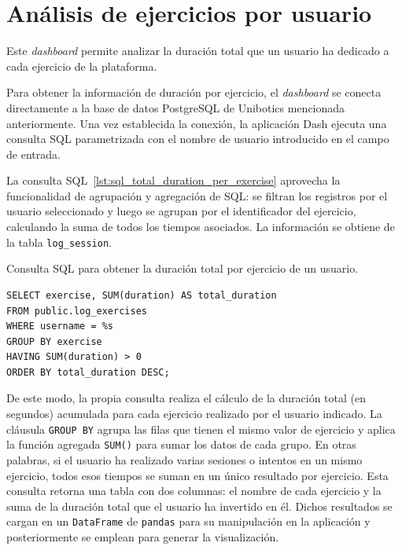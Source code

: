 \documentclass[a4paper, 12pt]{book}
\begin{document}
\section{Análisis de ejercicios por usuario}
\label{sec:dash1a}

Este \textit{dashboard} permite analizar la duración total que un usuario ha dedicado a cada ejercicio de la plataforma.

Para obtener la información de duración por ejercicio, el \textit{dashboard} se conecta directamente a la base de datos PostgreSQL de Unibotics mencionada anteriormente. Una vez establecida la conexión, la aplicación Dash ejecuta una consulta SQL parametrizada con el nombre de usuario introducido en el campo de entrada.

La consulta SQL~\ref{lst:sql_total_duration_per_exercise} aprovecha la funcionalidad de agrupación y agregación de SQL: se filtran los registros por el usuario seleccionado y luego se agrupan por el identificador del ejercicio, calculando la suma de todos los tiempos asociados. La información se obtiene de la tabla \texttt{log\_session}.

\begin{listing}[h!]
\caption{Consulta SQL para obtener la duración total por ejercicio de un usuario.}
\label{lst:sql_total_duration_per_exercise}
\begin{verbatim}
SELECT exercise, SUM(duration) AS total_duration
FROM public.log_exercises
WHERE username = %s
GROUP BY exercise
HAVING SUM(duration) > 0
ORDER BY total_duration DESC;
\end{verbatim}
\end{listing}

De este modo, la propia consulta realiza el cálculo de la duración total (en segundos) acumulada para cada ejercicio realizado por el usuario indicado. La cláusula \texttt{GROUP BY} agrupa las filas que tienen el mismo valor de ejercicio y aplica la función agregada \texttt{SUM()} para sumar los datos de cada grupo. En otras palabras, si el usuario ha realizado varias sesiones o intentos en un mismo ejercicio, todos esos tiempos se suman en un único resultado por ejercicio. Esta consulta retorna una tabla con dos columnas: el nombre de cada ejercicio y la suma de la duración total que el usuario ha invertido en él. Dichos resultados se cargan en un \texttt{DataFrame} de \texttt{pandas} para su manipulación en la aplicación y posteriormente se emplean para generar la visualización.
\end{document}

